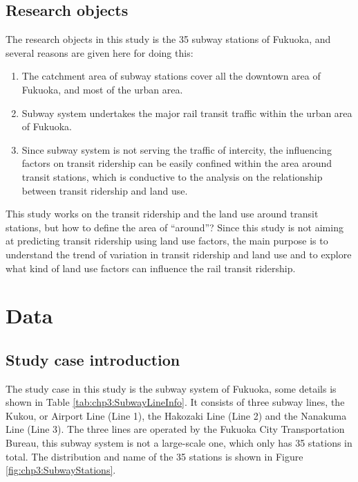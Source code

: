 %
\subsection{Research objects}
%
The research objects in this study is the 35 subway stations of Fukuoka, and several reasons are given here for doing this:

%
\begin{enumerate}
	\setlength{\parskip}{0\baselineskip} %
	\item The catchment area of subway stations cover all the downtown area of Fukuoka, and most of the urban area. 
	\item Subway system undertakes the major rail transit traffic within the urban area of Fukuoka. 
	\item Since subway system is not serving the traffic of intercity, the influencing factors on transit ridership can be easily confined within the area around transit stations, which is conductive to the analysis on the relationship between transit ridership and land use.
	\setlength{\parskip}{0.7\baselineskip} %
\end{enumerate}

%
This study works on the transit ridership and the land use around transit stations, but how to define the area of “around”? Since this study is not aiming at predicting transit ridership using land use factors, the main purpose is to understand the trend of variation in transit ridership and land use and to explore what kind of land use factors can influence the rail transit ridership.



%
\section{Data}
\subsection{Study case introduction}
%
The study case in this study is the subway system of Fukuoka, some details is shown in Table \ref{tab:chp3:SubwayLineInfo}. It consists of three subway lines, the Kukou, or Airport Line (Line 1), the Hakozaki Line (Line 2) and the Nanakuma Line (Line 3). The three lines are operated by the Fukuoka City Transportation Bureau, this subway system is not a large-scale one, which only has 35 stations in total. The distribution and name of the 35 stations is shown in Figure \ref{fig:chp3:SubwayStations}.

